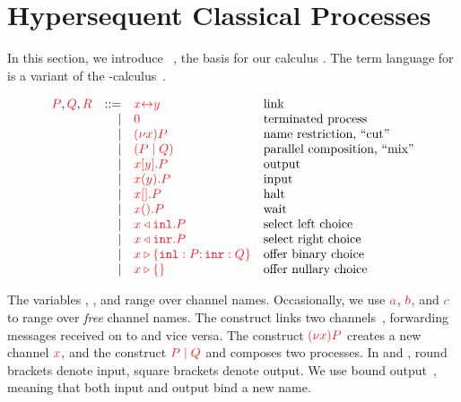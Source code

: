 \documentclass[envcountsame,UKenglish]{llncs}
\begin{document}
\section{Hypersequent Classical Processes}\label{sec:cp-revisited}
In this section, we introduce \dhcp~\cite{kokke2018tlla,kokke2019pacmpl}, the basis for our calculus \nodcap. 
%
The term language for \hcp is a variant of the \textpi-calculus~\cite{milner1992b}.
\begin{definition}[Terms]\label{def:hcp-terms}
  \[
    \begin{array}{lrll}
      \tm{P}, \tm{Q}, \tm{R}
        & ::=& \tm{\cpLink{x}{y}}    &\text{link}
      \\&\mid& \tm{\piHalt}          &\text{terminated process}
      \\&\mid& \tm{\piNew{x}{P}}     &\text{name restriction, ``cut''}
      \\&\mid& \tm{( \piPar{P}{Q} )} &\text{parallel composition, ``mix''}
      \\&\mid& \tm{\piSend{x}{y}{P}} &\text{output}
      \\&\mid& \tm{\piRecv{x}{y}{P}} &\text{input}
      \\&\mid& \tm{\piSend{x}{}{P}}  &\text{halt}
      \\&\mid& \tm{\cpWait{x}{}{P}}  &\text{wait}
      \\&\mid& \tm{\cpInl{x}{P}}     &\text{select left choice}
      \\&\mid& \tm{\cpInr{x}{P}}     &\text{select right choice}
      \\&\mid& \tm{\cpCase{x}{P}{Q}} &\text{offer binary choice}
      \\&\mid& \tm{\cpAbsurd{x}}     &\text{offer nullary choice}
    \end{array}
  \]
\end{definition}\noindent
The variables , ,  and  range over channel names. Occasionally, we use $\tm{a}$, $\tm{b}$, and $\tm{c}$ to range over \emph{free} channel names. The construct  links two channels~\cite{sangiorgi1996,boreale1998}, forwarding messages received on  to  and vice versa. The construct $\tm{\piNew{x}{P}}$ creates a new channel $\tm{x}$, and the construct $\tm{\piPar{P}{Q}}$ and composes two processes. In  and , round brackets denote input, square brackets denote output. We use bound output~\cite{sangiorgi1996}, meaning that both input and output bind a new name. 
\end{document}
